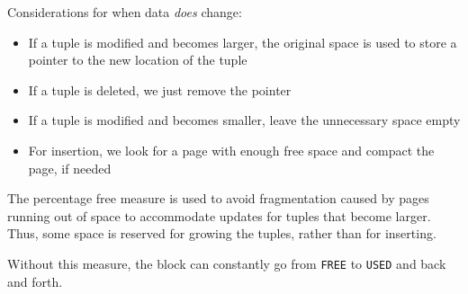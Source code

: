 Considerations for when data \textit{does} change:
\begin{itemize}
    \item If a tuple is modified and becomes larger, the original space is used to store a pointer to the new location of the tuple
    \item If a tuple is deleted, we just remove the pointer
    \item If a tuple is modified and becomes smaller, leave the unnecessary space empty
    \item For insertion, we look for a page with enough free space and compact the page, if needed
\end{itemize}

The percentage free measure is used to avoid fragmentation caused by pages running out of space to accommodate updates for tuples that become larger.
Thus, some space is reserved for growing the tuples, rather than for inserting.

Without this measure, the block can constantly go from \texttt{FREE} to \texttt{USED} and back and forth.
